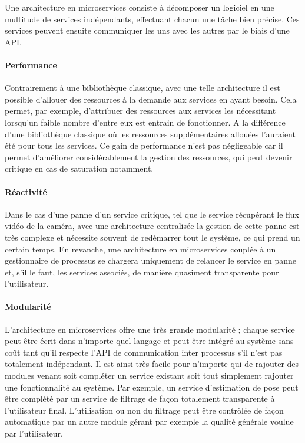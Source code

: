 Une architecture en microservices consiste à décomposer un logiciel en une multitude de services indépendants, effectuant chacun une tâche bien précise. Ces services peuvent ensuite communiquer les uns avec les autres par le biais d'une API.

\paragraph{Performance} Contrairement à une bibliothèque classique, avec une telle architecture il est possible d'allouer des ressources à la demande aux services en ayant besoin. Cela permet, par exemple, d'attribuer des ressources aux services les nécessitant lorsqu'un faible nombre d'entre eux est entrain de fonctionner. A la différence d'une bibliothèque classique où les ressources supplémentaires allouées l'auraient été pour tous les services. Ce gain de performance n'est pas négligeable car il permet d'améliorer considérablement la gestion des ressources, qui peut devenir critique en cas de saturation notamment.

\paragraph{Réactivité} Dans le cas d'une panne d'un service critique, tel que le service récupérant le flux vidéo de la caméra, avec une architecture centralisée la gestion de cette panne est très complexe et nécessite souvent de redémarrer tout le système, ce qui prend un certain temps. En revanche, une architecture en microservices couplée à un gestionnaire de processus se chargera uniquement de relancer le service en panne et, s'il le faut, les services associés, de manière quasiment transparente pour l'utilisateur.

\paragraph{Modularité} L'architecture en microservices offre une très grande modularité ; chaque service peut être écrit dans n'importe quel langage et peut être intégré au système sans coût tant qu'il respecte l'API de communication inter processus s'il n'est pas totalement indépendant. Il est ainsi très facile pour n'importe qui de rajouter des modules venant soit compléter un service existant soit tout simplement rajouter une fonctionnalité au système. Par exemple, un service d'estimation de pose peut être complété par un service de filtrage de façon totalement transparente à l'utilisateur final. L'utilisation ou non du filtrage peut être contrôlée de façon automatique par un autre module gérant par exemple la qualité générale voulue par l'utilisateur.

